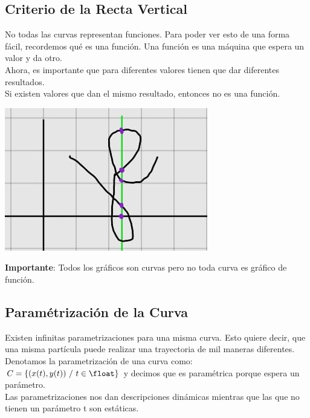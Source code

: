 \documentclass[10pt,a4paper]{article}
\begin{document}
\subsection*{Criterio de la Recta Vertical}
No todas las curvas representan funciones. Para poder ver esto de una forma fácil, recordemos qué es una función. Una función es una máquina que espera un valor y da otro. \\
Ahora, es importante que para diferentes valores tienen que dar diferentes resultados. \\
Si existen valores que dan el mismo resultado, entonces no es una función. 
\begin{center}
    \begin{minipage}[b]{0.3\textwidth}
        \includegraphics[width=\linewidth]{assets/criterio_recta_vertical.jpg}
        \centering
        \label{fig:criterio_recta_vertical}
    \end{minipage}
\end{center}
\textbf{Importante}: Todos los gráficos son curvas pero no toda curva es gráfico de función.
\subsection*{Paramétrización de la Curva}
Existen infinitas parametrizaciones para una misma curva. Esto quiere decir, que una misma partícula puede realizar una trayectoria de mil maneras diferentes. \\
Denotamos la parametrización de una curva como: $C = \{(x(t), y(t)) \ / \ t \in \float \}$ y decimos que es paramétrica porque espera un parámetro. \\
Las parametrizaciones nos dan descripciones dinámicas mientras que las que no tienen un parámetro t son estáticas.
\end{document}
